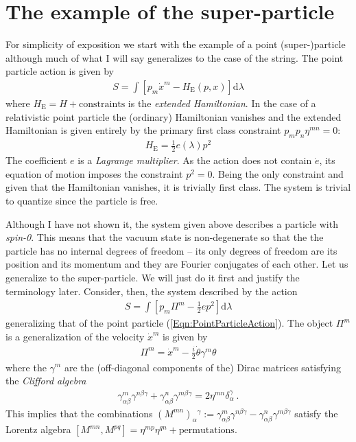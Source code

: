 \documentclass[12pt]{article}
\begin{document}
\section{The example of the super-particle}
For simplicity of exposition we start with the example of a point (super-)particle although much of what I will say generalizes to the case of the string. The point particle action is given by \cite{Dirac}
\begin{eqnarray}
\label{Eqn:PointParticleAction}
S=\int \left[ p_m\dot x^m-H_\mathrm{E}(p, x) \right]\mathrm d \lambda
\end{eqnarray}
where $H_\mathrm{E}=H+\mathrm{constraints}$ is the {\em extended Hamiltonian}. In the case of a relativistic point particle the (ordinary) Hamiltonian vanishes and the extended Hamiltonian is given entirely by the primary first class constraint $p_m p_n \eta^{mn}=0$:
\begin{eqnarray}
H_\mathrm{E}=\frac 12 e(\lambda) p^2
\end{eqnarray}
The coefficient $e$ is a {\em Lagrange multiplier}. As the action does not contain $\dot e$, its equation of motion imposes the constraint $p^2=0$. Being the only constraint and given that the Hamiltonian vanishes, it is trivially first class. The system is trivial to quantize since the particle is free. 

Although I have not shown it, the system given above describes a particle with {\em spin-0}. This means that the vacuum state is non-degenerate so that the the particle has no internal degrees of freedom -- its only degrees of freedom are its position and its momentum and they are Fourier conjugates of each other. Let us generalize to the super-particle. We will just do it first and justify the terminology later. Consider, then, the system described by the action
\begin{eqnarray}
S=\int \left[ p_m\Pi^m-\frac 12 e p^2 \right]\mathrm d \lambda
\end{eqnarray}
generalizing that of the point particle (\ref{Eqn:PointParticleAction}). The object $\Pi^m$ is a generalization of the velocity $\dot x^m$ is given by 
\begin{eqnarray}
\Pi^m=\dot x^m-\frac i2 \dot \theta \gamma^m \theta
\end{eqnarray}
where the $\gamma^m$ are the (off-diagonal components of the) Dirac matrices satisfying the {\em Clifford algebra}
\begin{eqnarray}
\gamma^m_{\alpha \beta} \gamma^{n\beta \gamma}+\gamma^n_{\alpha \beta} \gamma^{m\beta \gamma}=2 \eta^{mn}\delta_\alpha^\gamma~.
\end{eqnarray}
This implies that the combinations $(M^{mn})_\alpha{}^\gamma:=\gamma^m_{\alpha \beta} \gamma^{n\beta \gamma}-\gamma^n_{\alpha \beta} \gamma^{m\beta \gamma}$ satisfy the Lorentz algebra $[M^{mn},M^{pq}]=\eta^{mp}\eta^{qn}+\mathrm{permutations}$.
\end{document}
